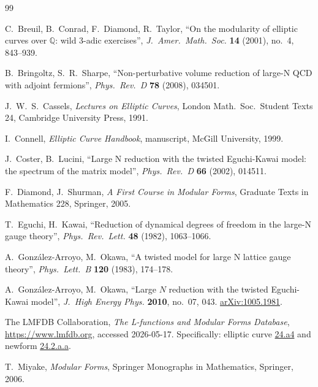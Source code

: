 \documentclass[11pt]{amsart}
\theoremstyle{definition}
\theoremstyle{remark}
\newcommand{\Q}{\mathbb{Q}}
\begin{document}
{\footnotesize{}}


\begin{thebibliography}{99}

C.~Breuil, B.~Conrad, F.~Diamond, R.~Taylor,
``On the modularity of elliptic curves over \(\Q\): wild 3-adic
exercises'', \emph{J.\ Amer.\ Math.\ Soc.} \textbf{14} (2001),
no.~4, 843--939.

B.~Bringoltz, S.~R.~Sharpe,
``Non-perturbative volume reduction of large-N QCD with
adjoint fermions'', \emph{Phys.\ Rev.\ D} \textbf{78} (2008), 034501.

J.~W.~S.~Cassels, \emph{Lectures on Elliptic Curves},
London Math.\ Soc.\ Student Texts 24, Cambridge University Press,
1991.

I.~Connell, \emph{Elliptic Curve Handbook}, manuscript, McGill
University, 1999.

J.~Coster, B.~Lucini,
``Large N reduction with the twisted Eguchi-Kawai model:
the spectrum of the matrix model'', \emph{Phys.\ Rev.\ D}
\textbf{66} (2002), 014511.

F.~Diamond, J.~Shurman,
\emph{A First Course in Modular Forms},
Graduate Texts in Mathematics 228, Springer, 2005.

T.~Eguchi, H.~Kawai,
``Reduction of dynamical degrees of freedom in the large-N gauge
theory'', \emph{Phys.\ Rev.\ Lett.} \textbf{48} (1982), 1063--1066.

A.~Gonz\'alez-Arroyo, M.~Okawa,
``A twisted model for large N lattice gauge theory'',
\emph{Phys.\ Lett.\ B} \textbf{120} (1983), 174--178.

A.~Gonz\'alez-Arroyo, M.~Okawa,
``Large \(N\) reduction with the twisted Eguchi-Kawai model'',
\emph{J.\ High Energy Phys.} \textbf{2010}, no.~07, 043.
\href{https://arxiv.org/abs/1005.1981}{arXiv:1005.1981}.

The LMFDB Collaboration, \emph{The L-functions and Modular Forms
Database}, \url{https://www.lmfdb.org}, accessed 2026-05-17.
Specifically: elliptic curve
\href{https://www.lmfdb.org/EllipticCurve/Q/24/a/4}{24.a4}
and newform
\href{https://www.lmfdb.org/ModularForm/GL2/Q/holomorphic/24/2/a/a/}{24.2.a.a}.

T.~Miyake, \emph{Modular Forms},
Springer Monographs in Mathematics, Springer, 2006.


\end{thebibliography}
\end{document}
